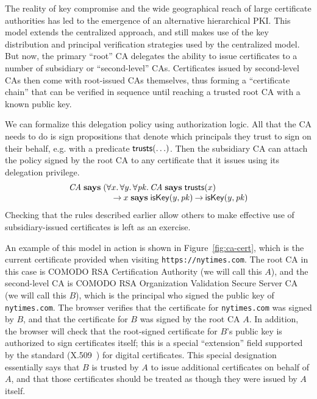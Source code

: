 \documentclass[11pt]{article}
\begin{document}
The reality of key compromise and the wide geographical reach of large
certificate authorities has led to the emergence of an alternative
hierarchical PKI. This model extends the centralized approach, and
still makes use of the key distribution and principal verification
strategies used by the centralized model. But now, the primary
``root'' CA delegates the ability to issue certificates to a
number of subsidiary or ``second-level'' CAs. Certificates issued by
second-level CAs then come with root-issued CAs themselves, thus
forming a ``certificate chain'' that can be verified in sequence until
reaching a trusted root CA with a known public key.

We can formalize this delegation policy using authorization logic. All that the
CA needs to do is sign propositions that denote which principals they trust to
sign on their behalf, e.g. with a predicate $\mathsf{trusts}(\ldots)$. Then the
subsidiary CA can attach the policy signed by the root CA to any certificate
that it issues using its delegation privilege.
\[
  \begin{array}{l}
    \mi{CA} \says (\forall x.\, \forall y.\, \forall \mi{pk}.\,
    \mi{CA} \says \ms{trusts}(x) \\
    \hspace{5em} \null \arrow x \says \ms{isKey}(y, \mi{pk}) \arrow \ms{isKey}(y, \mi{pk})
  \end{array}
\]
Checking that the rules described earlier allow others to make effective use of
subsidiary-issued certificates is left as an exercise.

An example of this model in action is shown in Figure~\ref{fig:ca-cert},
which is the current certificate provided when visiting
\nolinkurl{https://nytimes.com}. The root CA in this case is
COMODO RSA Certification Authority (we will call this $A$), and
the second-level CA is COMODO RSA Organization Validation Secure
Server CA (we will call this $B$), which is the principal who signed
the public key of \nolinkurl{nytimes.com}. The browser verifies that
the certificate for \nolinkurl{nytimes.com} was signed by $B$, and
that the certificate for $B$ was signed by the root CA $A$. In
addition, the browser will check that the root-signed certificate for
$B$'s public key is authorized to sign certificates itself; this is a
special ``extension'' field supported by the standard
(X.509~\citep{crl}) for digital certificates. This special
designation essentially says that $B$ is trusted by $A$ to issue
additional certificates on behalf of $A$, and that those certificates
should be treated as though they were issued by $A$ itself.
\end{document}
